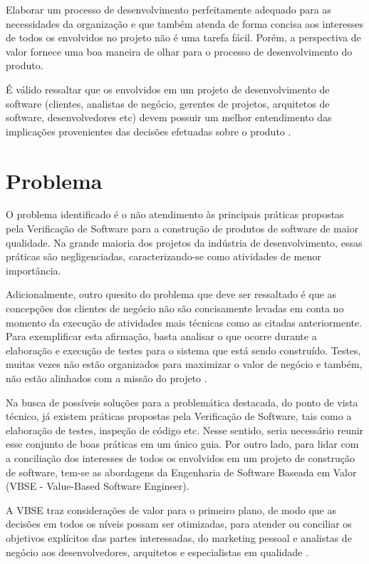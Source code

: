 Elaborar um processo de desenvolvimento perfeitamente adequado para as necessidades da organização e que também atenda de forma concisa aos interesses de todos os envolvidos no projeto não é uma tarefa fácil. Porém, a perspectiva de valor fornece uma boa maneira de olhar para o processo de desenvolvimento do produto.

É válido ressaltar que os envolvidos em um projeto de desenvolvimento de software (clientes, analistas de negócio, gerentes de projetos, arquitetos de software, desenvolvedores etc) devem possuir um melhor entendimento das implicações provenientes das decisões efetuadas sobre o produto \cite{vbse1}.

\section{Problema}

O problema identificado é o não atendimento às principais práticas propostas pela Verificação de Software para a construção de produtos de software de maior qualidade. Na grande maioria dos projetos da indústria de desenvolvimento, essas práticas são negligenciadas, caracterizando-se como atividades de menor importância.

Adicionalmente, outro quesito do problema que deve ser ressaltado é que as concepções dos clientes de negócio não são concisamente levadas em conta no momento da execução de atividades mais técnicas como as citadas anteriormente. Para exemplificar esta afirmação, basta analisar o que ocorre durante a elaboração e execução de testes para o sistema que está sendo construído. Testes, muitas vezes não estão organizados para maximizar o valor de negócio e também, não estão alinhados com a missão do projeto \cite{vbse2}.

Na busca de possíveis soluções para a problemática destacada, do ponto de vista técnico, já existem práticas propostas pela Verificação de Software, tais como a elaboração de testes, inspeção de código etc. Nesse sentido, seria necessário reunir esse conjunto de boas práticas em um único guia. Por outro lado, para lidar com a conciliação dos interesses de todos os envolvidos em um projeto de construção de software, tem-se as abordagens da Engenharia de Software Baseada em Valor (VBSE - Value-Based Software Engineer).

A VBSE traz considerações de valor para o primeiro plano, de modo que as decisões em todos os níveis possam ser otimizadas, para atender ou conciliar os objetivos explícitos das partes interessadas, do marketing pessoal e analistas de negócio aos desenvolvedores, arquitetos e especialistas em qualidade \cite{vbse1}.

